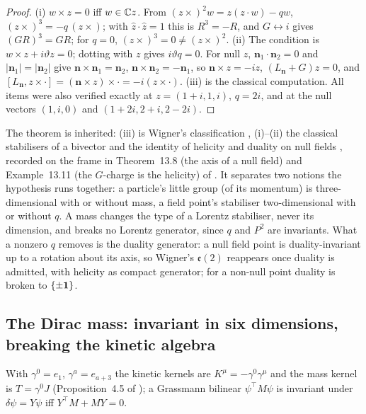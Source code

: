 \begin{proof}
(i) $w\times z=0$ iff $w\in\mathbb{C} z$. From $(z\times)^2w=z(z\cdot w)-qw$, $(z\times)^3=-q\,(z\times)$; with $\hat z\cdot\hat z=1$ this is $R^3=-R$, and
$G\leftrightarrow i$ gives $(GR)^3=GR$; for $q=0$, $(z\times)^3=0\neq(z\times)^2$. (ii) The condition is $w\times z+i\vartheta z=0$; dotting with $z$ gives
$i\vartheta q=0$. For null $z$, $\mathbf n_1\cdot\mathbf n_2=0$ and $|\mathbf n_1|=|\mathbf n_2|$ give $\mathbf n\times\mathbf n_1=\mathbf n_2$, $\mathbf n\times\mathbf n_2=-\mathbf n_1$,
so $\mathbf n\times z=-iz$, $(L_{\mathbf n}+G)z=0$, and $[L_{\mathbf n},z\times\cdot]=(\mathbf n\times z)\times\cdot=-i(z\times\cdot)$. (iii) is the classical
computation. All items were also verified exactly at $z=(1+i,1,i)$, $q=2i$, and at the null vectors $(1,i,0)$ and $(1+2i,2+i,2-2i)$.
\end{proof}

The theorem is inherited: (iii) is Wigner's classification \cite{Wigner39,WeinbergQFT}, (i)--(ii) the classical stabilisers of a bivector and the
identity of helicity and duality on null fields \cite{PenroseRindler84,Calkin65}, recorded on the frame in Theorem~13.8 (the axis of a null field)
and Example~13.11 (the $G$-charge is the helicity) of \cite{ES17}. It separates two notions the hypothesis runs together: a particle's little group (of its momentum) is three-dimensional with or without
mass, a field point's stabiliser two-dimensional with or without $q$. A mass changes the type of a Lorentz stabiliser, never its dimension, and
breaks no Lorentz generator, since $q$ and $P^2$ are invariants. What a nonzero $q$ removes is the duality generator: a null field point is
duality-invariant up to a rotation about its axis, so Wigner's $\mathfrak e(2)$ reappears once duality is admitted, with helicity as compact
generator; for a non-null point duality is broken to $\{\pm\mathbf 1\}$.

\subsection{The Dirac mass: invariant in six dimensions, breaking the kinetic algebra}
\label{d2:sec:dirac}

With $\gamma^0=e_1$, $\gamma^a=e_{a+3}$ the kinetic kernels are $K^\mu=-\gamma^0\gamma^\mu$ and the mass kernel is $T=\gamma^0J$ (Proposition~4.5 of
\cite{ES17}); a Grassmann bilinear $\psi^{\!\top}M\psi$ is invariant under $\delta\psi=Y\psi$ iff $Y^{\!\top}M+MY=0$.

